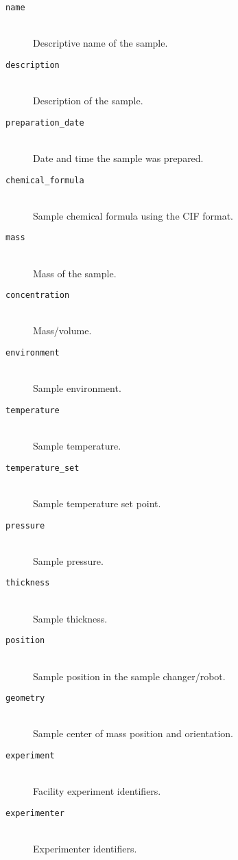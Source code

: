 \begin{description}
\item[\tt {name}] \hfill \\
{Descriptive name of the sample.}

\item[\tt {description}] \hfill \\
{Description of the sample.}

\item[\tt {preparation\_date}] \hfill \\
{Date and time the sample was prepared.}

\item[\tt {chemical\_formula}] \hfill \\
{Sample chemical formula using the CIF format.}

\item[\tt {mass}] \hfill \\
{Mass of the sample.}

\item[\tt {concentration}] \hfill \\
{Mass/volume.}

\item[\tt {environment}] \hfill \\
{Sample environment.}

\item[\tt {temperature}] \hfill \\
{Sample temperature.}

\item[\tt {temperature\_set}] \hfill \\
{Sample temperature set point.}

\item[\tt {pressure}] \hfill \\
{Sample pressure.}

\item[\tt {thickness}] \hfill \\
{Sample thickness.}

\item[\tt {position}] \hfill \\
{Sample position in the sample changer/robot.}

\item[\tt {geometry}] \hfill \\
{Sample center of mass position and orientation.}

\item[\tt {experiment}] \hfill \\
{Facility experiment identifiers.}

\item[\tt {experimenter}] \hfill \\
{Experimenter identifiers.}
\end{description}

